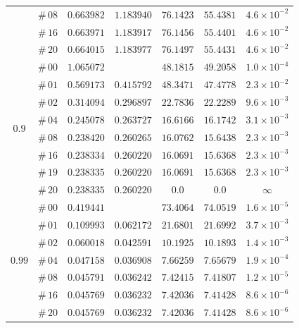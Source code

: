 \documentclass[12pt]{extarticle}
\theoremstyle{plain}
\theoremstyle{remark}
\begin{document}
\begin{table}[!ht]
\begin{center}
\begin{tabular}{ccccccc}
 & $\#\,08$ & $0.663982$ & $1.183940$ & $76.1423$ & $55.4381$ & $4.6\times10^{-2}$ \\
 & $\#\,16$ & $0.663971$ & $1.183917$ & $76.1456$ & $55.4401$ & $4.6\times10^{-2}$ \\
 & $\#\,20$ & $0.664015$ & $1.183977$ & $76.1497$ & $55.4431$ & $4.6\times10^{-2}$ \\
\midrule
\multirow{8}{*}{$0.9$} & $\#\,00$ & $1.065072$ &  & $48.1815$ & $49.2058$ & $1.0\times10^{-4}$ \\
 & $\#\,01$ & $0.569173$ & $0.415792$ & $48.3471$ & $47.4778$ & $2.3\times10^{-2}$ \\
 & $\#\,02$ & $0.314094$ & $0.296897$ & $22.7836$ & $22.2289$ & $9.6\times10^{-3}$ \\
 & $\#\,04$ & $0.245078$ & $0.263727$ & $16.6166$ & $16.1742$ & $3.1\times10^{-3}$ \\
 & $\#\,08$ & $0.238420$ & $0.260265$ & $16.0762$ & $15.6438$ & $2.3\times10^{-3}$ \\
 & $\#\,16$ & $0.238334$ & $0.260220$ & $16.0691$ & $15.6368$ & $2.3\times10^{-3}$ \\
 & $\#\,19$ & $0.238335$ & $0.260220$ & $16.0691$ & $15.6368$ & $2.3\times10^{-3}$ \\
 & $\#\,20$ & $0.238335$ & $0.260220$ & $0.0$ & $0.0$ & $\infty$ \\
\midrule
\multirow{7}{*}{$0.99$} & $\#\,00$ & $0.419441$ &  & $73.4064$ & $74.0519$ & $1.6\times10^{-5}$ \\
 & $\#\,01$ & $0.109993$ & $0.062172$ & $21.6801$ & $21.6992$ & $3.7\times10^{-3}$ \\
 & $\#\,02$ & $0.060018$ & $0.042591$ & $10.1925$ & $10.1893$ & $1.4\times10^{-3}$ \\
 & $\#\,04$ & $0.047158$ & $0.036908$ & $7.66259$ & $7.65679$ & $1.9\times10^{-4}$ \\
 & $\#\,08$ & $0.045791$ & $0.036242$ & $7.42415$ & $7.41807$ & $1.2\times10^{-5}$ \\
 & $\#\,16$ & $0.045769$ & $0.036232$ & $7.42036$ & $7.41428$ & $8.6\times10^{-6}$ \\
 & $\#\,20$ & $0.045769$ & $0.036232$ & $7.42036$ & $7.41428$ & $8.6\times10^{-6}$ \\
\bottomrule
\end{tabular}
\label{supp-table-3D-IterativeMethod-M=0.25}
\end{center}
\end{table}
\end{document}
